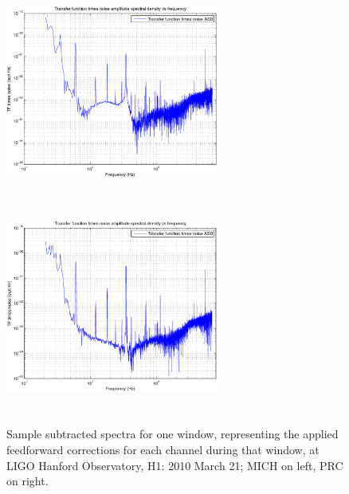 \begin{figure}
\begin{center}
\includegraphics[height=70mm, width=70mm]{figure5a.eps}
\includegraphics[height=70mm, width=70mm]{figure5b.eps}
\caption{Sample subtracted spectra for one window, representing the applied feedforward corrections for each channel during that window, at LIGO Hanford Observatory, H1: 2010 March 21; MICH on left, PRC on right. }
\label{subtractedSpectrum}
\end{center}
\end{figure}



